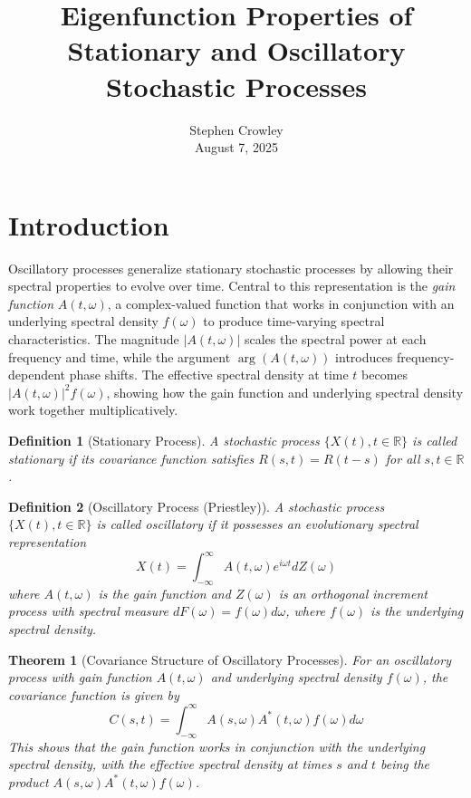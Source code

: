 \documentclass{article}
\newcommand{\tmaffiliation}[1]{\\ #1}
\newcommand{\tmem}[1]{{\em #1\/}}
\newtheorem{definition}{Definition}
\newtheorem{theorem}{Theorem}
\begin{document}
\title{Eigenfunction Properties of Stationary and Oscillatory Stochastic
Processes}

\author{
  Stephen Crowley
  \tmaffiliation{August 7, 2025}
}

\date{}

\maketitle

\section*{Introduction}

Oscillatory processes generalize stationary stochastic processes by allowing
their spectral properties to evolve over time. Central to this representation
is the {\tmem{gain function}} $A (t, \omega)$, a complex-valued function that
works in conjunction with an underlying spectral density $f (\omega)$ to
produce time-varying spectral characteristics. The magnitude $|A (t, \omega)
|$ scales the spectral power at each frequency and time, while the argument
$\arg (A (t, \omega))$ introduces frequency-dependent phase shifts. The
effective spectral density at time $t$ becomes $|A (t, \omega) |^2 f
(\omega)$, showing how the gain function and underlying spectral density work
together multiplicatively.

\begin{definition}
  [Stationary Process] A stochastic process $\{X (t), t \in \mathbb{R}\}$ is
  called stationary if its covariance function satisfies $R (s, t) = R (t -
  s)$ for all $s, t \in \mathbb{R}$.
\end{definition}

\begin{definition}
  [Oscillatory Process (Priestley)] A stochastic process $\{X (t), t \in
  \mathbb{R}\}$ is called oscillatory if it possesses an evolutionary spectral
  representation
  \begin{equation}
    X (t) = \int_{- \infty}^{\infty} A (t, \omega) e^{i \omega t} dZ (\omega)
  \end{equation}
  where $A (t, \omega)$ is the gain function and $Z (\omega)$ is an orthogonal
  increment process with spectral measure $dF (\omega) = f (\omega) d \omega$,
  where $f (\omega)$ is the underlying spectral density.
\end{definition}

\begin{theorem}
  [Covariance Structure of Oscillatory Processes] For an oscillatory process
  with gain function $A (t, \omega)$ and underlying spectral density $f
  (\omega)$, the covariance function is given by
  \begin{equation}
    C (s, t) = \int_{- \infty}^{\infty} A (s, \omega) A^{\ast} (t, \omega) f
    (\omega) d \omega
  \end{equation}
  This shows that the gain function works in conjunction with the underlying
  spectral density, with the effective spectral density at times $s$ and $t$
  being the product $A (s, \omega) A^{\ast} (t, \omega) f (\omega)$.
\end{theorem}
\end{document}
